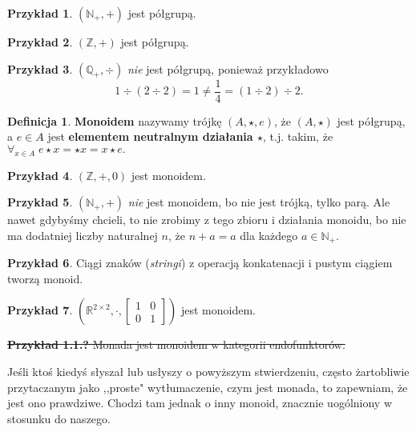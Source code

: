 \documentclass{article}
\theoremstyle{definition}
\newtheorem{definition}{Definicja}[section]
\newtheorem{example}{Przykład}[section]
\begin{document}
\begin{example}
	$(\mathbb{N}_+, +)$ jest półgrupą.
\end{example}

\begin{example}
	$(\mathbb{Z}, +)$ jest półgrupą.
\end{example}

\begin{example}
	$(\mathbb{Q}_+, \div)$ \textit{nie} jest półgrupą, ponieważ przykładowo
	\begin{equation*}
		1 \div (2 \div 2) = 1 \neq \frac{1}{4} = (1\div2)\div2.
	\end{equation*}
\end{example}


\begin{definition}
	\textbf{Monoidem} nazywamy trójkę $(A, \star, e)$, że $(A, \star)$ jest półgrupą, a $e\in A$ jest \textbf{elementem neutralnym działania $\star$}, t.j. takim, że
	\begin{math}
		\forall_{x \in A}\; e \star x = \star x = x \star e.
	\end{math}
\end{definition}

\begin{example}
	$(\mathbb{Z}, +, 0)$ jest monoidem.
\end{example}

\begin{example}
	$(\mathbb{N}_+, +)$ \textit{nie} jest monoidem, bo nie jest trójką, tylko parą.
	Ale nawet gdybyśmy chcieli, to nie zrobimy z tego zbioru i działania monoidu, bo nie ma dodatniej liczby naturalnej $n$, że $n + a = a$ dla każdego $a \in \mathbb{N}_+$.
\end{example}

\begin{example}
	Ciągi znaków (\textit{stringi}) z operacją konkatenacji i pustym ciągiem tworzą monoid.
\end{example}

\begin{example}
	$(\mathbb{R}^{2 \times 2}, \cdot, \left[\begin{matrix} 1 & 0 \\ 0 & 1 \end{matrix}\right])$ jest monoidem.
\end{example}


\noindent\sout{
	\textbf{Przykład 1.1.?} Monada jest monoidem w kategorii endofunktorów.
}

Jeśli ktoś kiedyś słyszał lub usłyszy o powyższym stwierdzeniu, często żartobliwie przytaczanym jako ,,proste" wytłumaczenie, czym jest monada, to zapewniam, że jest ono prawdziwe. Chodzi tam jednak o inny monoid, znacznie uogólniony w stosunku do naszego.
\end{document}
